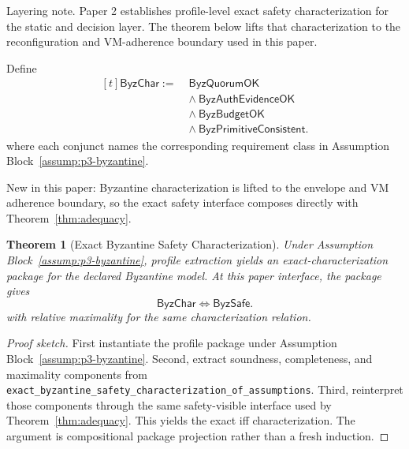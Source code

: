 \documentclass[a4paper,10pt,twocolumn,english]{article}
\numberwithin{equation}{section}
\theoremstyle{paperdef}
\theoremstyle{paperplain}
\newtheorem{theorem}[definition]{Theorem}
\theoremstyle{paperdef}
\theoremstyle{paperremark}
\theoremstyle{paperdef}
\newcommand{\ByzSafe}{\ensuremath{\mathsf{ByzSafe}}}
\newcommand{\ByzChar}{\ensuremath{\mathsf{ByzChar}}}
\begin{document}
Layering note. Paper 2 establishes profile-level exact safety characterization
for the static and decision layer. The theorem below lifts that characterization
to the reconfiguration and VM-adherence boundary used in this paper.

Define
\begin{equation}
	\begin{aligned}[t]
		\ByzChar
		:=\; & \mathsf{ByzQuorumOK}                    \\
		     & \land\ \mathsf{ByzAuthEvidenceOK}       \\
		     & \land\ \mathsf{ByzBudgetOK}             \\
		     & \land\ \mathsf{ByzPrimitiveConsistent}.
	\end{aligned}
\end{equation}
where each conjunct names the corresponding requirement class in Assumption Block~\ref{assump:p3-byzantine}.

New in this paper: Byzantine characterization is lifted to the envelope and VM
adherence boundary, so the exact safety interface composes directly with
Theorem~\ref{thm:adequacy}.

\begin{theorem}[Exact Byzantine Safety Characterization]
	\label{thm:byzantine}
	Under Assumption Block~\ref{assump:p3-byzantine}, profile extraction yields an exact-characterization package for the declared Byzantine model. At this paper interface, the package gives
	\begin{equation}
		\ByzChar \iff \ByzSafe.
	\end{equation}
	with relative maximality for the same characterization relation.
\end{theorem}

\begin{proof}[Proof sketch]
	First instantiate the profile package under
	Assumption Block~\ref{assump:p3-byzantine}. Second, extract soundness,
	completeness, and maximality components from
	\nolinkurl{exact_byzantine_safety_characterization_of_assumptions}. Third, reinterpret those
	components through the same safety-visible interface used by
	Theorem~\ref{thm:adequacy}. This yields the exact iff characterization.
	The argument is compositional package projection rather than a fresh induction.
\end{proof}
\end{document}
